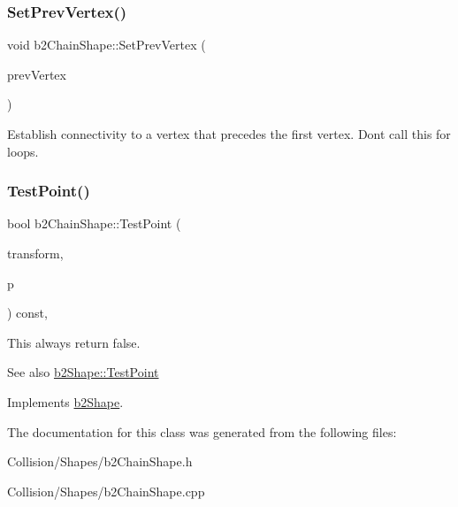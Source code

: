 \subsubsection{\texorpdfstring{Set\+Prev\+Vertex()}{SetPrevVertex()}}
{\footnotesize\ttfamily void b2\+Chain\+Shape\+::\+Set\+Prev\+Vertex (\begin{DoxyParamCaption}\item[{const \mbox{\hyperlink{structb2Vec2}{b2\+Vec2}} \&}]{prev\+Vertex }\end{DoxyParamCaption})}

Establish connectivity to a vertex that precedes the first vertex. Don\textquotesingle{}t call this for loops. \mbox{\label{classb2ChainShape_afd03c8679f18f9962a6c76bde629c62a}} 
\subsubsection{\texorpdfstring{Test\+Point()}{TestPoint()}}
{\footnotesize\ttfamily bool b2\+Chain\+Shape\+::\+Test\+Point (\begin{DoxyParamCaption}\item[{const \mbox{\hyperlink{structb2Transform}{b2\+Transform}} \&}]{transform,  }\item[{const \mbox{\hyperlink{structb2Vec2}{b2\+Vec2}} \&}]{p }\end{DoxyParamCaption}) const\hspace{0.3cm}{\ttfamily [override]}, {\ttfamily [virtual]}}

This always return false. \begin{DoxySeeAlso}{See also}
\mbox{\hyperlink{classb2Shape_a6ac968e403e2d93e8ae46d728a2e50fa}{b2\+Shape\+::\+Test\+Point}} 
\end{DoxySeeAlso}


Implements \mbox{\hyperlink{classb2Shape_a6ac968e403e2d93e8ae46d728a2e50fa}{b2\+Shape}}.



The documentation for this class was generated from the following files\+:\begin{DoxyCompactItemize}
\item 
Collision/\+Shapes/b2\+Chain\+Shape.\+h\item 
Collision/\+Shapes/b2\+Chain\+Shape.\+cpp\end{DoxyCompactItemize}
